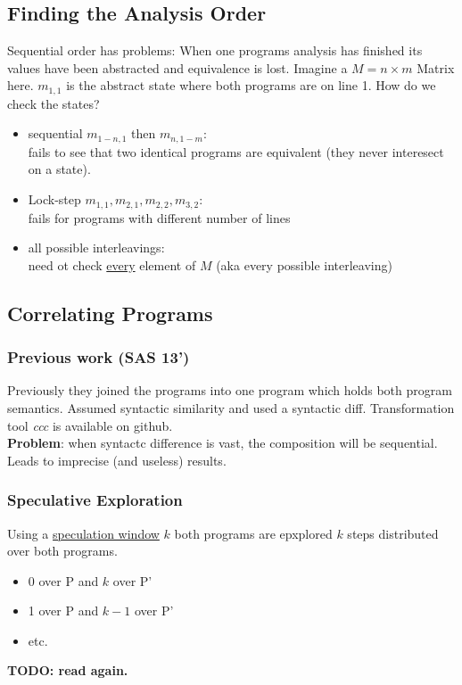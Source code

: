 \subsection{Finding the Analysis Order}
Sequential order has problems: When one programs analysis has finished its values have been abstracted and equivalence is lost. 
Imagine a $M=n \times m$ Matrix here. $m_{1,1}$ is the abstract state where both programs are on line 1. How do we check the states?\\
\begin{itemize}
\item sequential $m_{1-n,1}$ then $m_{n,1-m}$:\\ 
fails to see that two identical programs are equivalent (they never interesect on a state).
\item Lock-step $m_{1,1}, m_{2,1}, m_{2,2}, m_{3,2}$:\\
fails for programs with different number of lines
\item all possible interleavings:\\
need ot check \underline{every} element of $M$ (aka every possible interleaving)
\end{itemize} 
\subsection{Correlating Programs}
\subsubsection{Previous work (SAS 13')}
Previously they joined the programs into one program which holds both program semantics. Assumed syntactic similarity and used a syntactic diff. Transformation tool \textit{ccc} is available on github. \\
\textbf{Problem}: when syntactc difference is vast, the composition will be sequential. Leads to imprecise (and useless) results. 
\subsubsection{Speculative Exploration}
Using a \underline{speculation window} $k$ both programs are epxplored $k$ steps distributed over both programs. 
\begin{itemize}
\item 0 over P and $k$ over P'
\item 1 over P and $k-1$ over P'
\item etc.
\end{itemize}
\textbf{TODO: read again.}